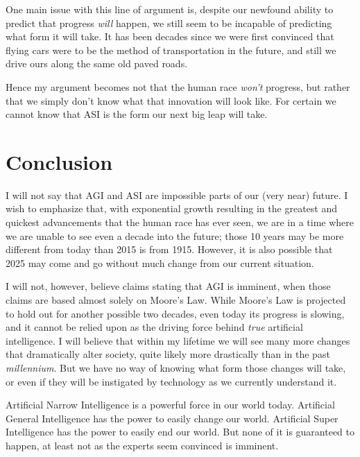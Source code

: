 \documentclass[12pt]{article} %
\begin{document}
One main issue with this line of argument is, despite our newfound ability to predict that progress \textit{will} happen, we still seem to be incapable of predicting what form it will take. It has been decades since we were first convinced that flying cars were to be the method of transportation in the future, and still we drive ours along the same old paved roads.

Hence my argument becomes not that the human race \textit{won't} progress, but rather that we simply don't know what that innovation will look like. For certain we cannot know that ASI is the form our next big leap will take.


\section{Conclusion} %

I will not say that AGI and ASI are impossible parts of our (very near) future. I wish to emphasize that, with exponential growth resulting in the greatest and quickest advancements that the human race has ever seen, we are in a time where we are unable to see even a decade into the future; those 10 years may be more different from today than 2015 is from 1915. However, it is also possible that 2025 may come and go without much change from our current situation.

I will not, however, believe claims stating that AGI is imminent, when those claims are based almost solely on Moore's Law. While Moore's Law is projected to hold out for another possible two decades, even today its progress is slowing, and it cannot be relied upon as the driving force behind \textit{true} artificial intelligence. I will believe that within my lifetime we will see many more changes that dramatically alter society, quite likely more drastically than in the past \textit{millennium}. But we have no way of knowing what form those changes will take, or even if they will be instigated by technology as we currently understand it.

Artificial Narrow Intelligence is a powerful force in our world today. Artificial General Intelligence has the power to easily change our world. Artificial Super Intelligence has the power to easily end our world. But none of it is guaranteed to happen, at least not as the experts seem convinced is imminent.
\end{document}

